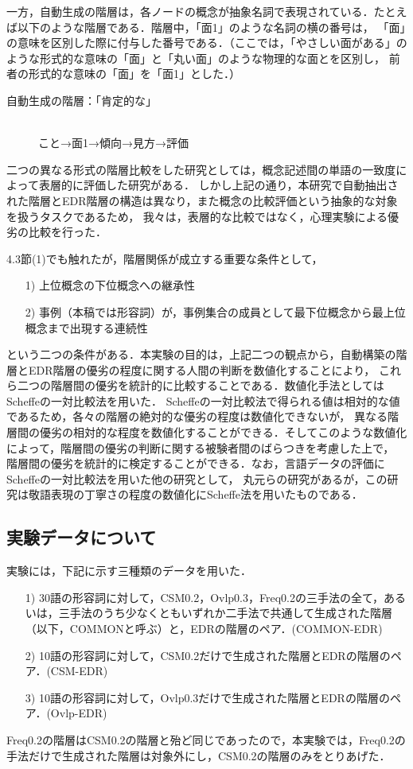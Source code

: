 \documentclass[japanese]{jnlp_1.4}
\begin{document}
一方，自動生成の階層は，各ノードの概念が抽象名詞で表現されている．たとえば以下のような階層である．階層中，「面1」のような名詞の横の番号は，
「面」の意味を区別した際に付与した番号である．（ここでは，「やさしい面がある」のような形式的な意味の「面」と「丸い面」のような物理的な面とを区別し，
前者の形式的な意味の「面」を「面1」とした．）


\begin{description}
\item[自動生成の階層：「肯定的な」]\mbox{}\\
こと→面1→傾向→見方→評価
\end{description}

二つの異なる形式の階層比較をした研究としては，概念記述間の単語の一致度によって表層的に評価した研究がある\cite{Article_38}．
しかし上記の通り，本研究で自動抽出された階層とEDR階層の構造は異なり，また概念の比較評価という抽象的な対象を扱うタスクであるため，
我々は，表層的な比較ではなく，心理実験による優劣の比較を行った．

4.3節(1)でも触れたが，階層関係が成立する重要な条件として，
\begin{itemize}
\item[1)]
上位概念の下位概念への継承性 
\item[2)]
事例（本稿では形容詞）が，事例集合の成員として最下位概念から最上位概念まで出現する連続性 
\end{itemize}
という二つの条件がある．本実験の目的は，上記二つの観点から，自動構築の階層とEDR階層の優劣の程度に関する人間の判断を数値化することにより，
これら二つの階層間の優劣を統計的に比較することである．数値化手法としてはScheffeの一対比較法を用いた\cite{Article_32}．
Scheffeの一対比較法で得られる値は相対的な値であるため，各々の階層の絶対的な優劣の程度は数値化できないが，
異なる階層間の優劣の相対的な程度を数値化することができる．そしてこのような数値化によって，階層間の優劣の判断に関する被験者間のばらつきを考慮した上で，
階層間の優劣を統計的に検定することができる．なお，言語データの評価にScheffeの一対比較法を用いた他の研究として，
丸元らの研究があるが，この研究は敬語表現の丁寧さの程度の数値化にScheffe法を用いたものである\cite{Article_23}．


\subsection{実験データについて}

実験には，下記に示す三種類のデータを用いた．
\begin{itemize}
\item[1)]
30語の形容詞に対して，CSM0.2，Ovlp0.3，Freq0.2の三手法の全て，あるいは，三手法のうち少なくともいずれか二手法で共通して生成された階層
（以下，COMMONと呼ぶ）と，EDRの階層のペア．(COMMON-EDR)
\item[2)]
10語の形容詞に対して，CSM0.2だけで生成された階層とEDRの階層のペア．(CSM-EDR)
\item[3)]
10語の形容詞に対して，Ovlp0.3だけで生成された階層とEDRの階層のペア．(Ovlp-EDR)
\end{itemize}
Freq0.2の階層はCSM0.2の階層と殆ど同じであったので，本実験では，Freq0.2の手法だけで生成された階層は対象外にし，CSM0.2の階層のみをとりあげた．
\end{document}
